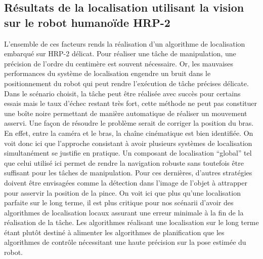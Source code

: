\subsection{Résultats de la localisation utilisant la vision sur le robot humanoïde HRP-2}

L'ensemble de ces facteurs rends la réalisation d'un algorithme de
localisation embarqué sur HRP-2 délicat. Pour réaliser une tâche de
manipulation, une précision de l'ordre du centimère est souvent
nécessaire. Or, les mauvaises performances du système de localisation
engendre un bruit dans le positionnement du robot qui peut rendre
l'exécution de tâche précises délicate. Dans le scénario choisit, la
tâche peut être réalisée avec succès pour certains essais mais le taux
d'échec restant très fort, cette méthode ne peut pas constituer une
boîte noire permettant de manière automatique de réaliser un mouvement
asservi. Une façon de résoudre le problème serait de corriger la
position du bras. En effet, entre la caméra et le bras, la chaîne
cinématique est bien identifiée. On voit donc ici que l'approche
consistant à avoir plusieurs systèmes de localisation simultanément se
justifie en pratique. Un composant de localisation ``global'' tel que
celui utilisé ici permet de rendre la navigation robuste sans
toutefois être suffisant pour les tâches de manipulation. Pour ces
dernières, d'autres stratégies doivent être envisagées comme la
détection dans l'image de l'objet à attrapper pour asservir la
position de la pince. On voit ici que plus qu'une localisation
parfaite sur le long terme, il est plus critique pour nos scénarii
d'avoir des algorithmes de localisation locaux assurant une erreur
minimale à la fin de la réalisation de la tâche. Les algorithmes
réalisant une localisation sur le long terme étant plutôt destiné à
alimenter les algorithmes de planification que les algorithmes de
contrôle nécessitant une haute précision sur la pose estimée du robot.




